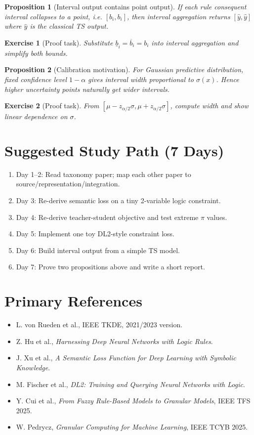 ﻿\documentclass[11pt,a4paper]{article}
\newtheorem{proposition}{Proposition}
\newtheorem{exercise}{Exercise}
\begin{document}
\begin{proposition}[Interval output contains point output]
If each rule consequent interval collapses to a point, i.e. $[b_i,b_i]$, then interval aggregation returns
\([\hat y,\hat y]\)
where $\hat y$ is the classical TS output.
\end{proposition}

\begin{exercise}[Proof task]
Substitute $\underline b_i=\overline b_i=b_i$ into interval aggregation and simplify both bounds.
\end{exercise}

\begin{proposition}[Calibration motivation]
For Gaussian predictive distribution, fixed confidence level $1-\alpha$ gives interval width proportional to $\sigma(x)$.
Hence higher uncertainty points naturally get wider intervals.
\end{proposition}

\begin{exercise}[Proof task]
From $[\mu-z_{\alpha/2}\sigma,\mu+z_{\alpha/2}\sigma]$, compute width and show linear dependence on $\sigma$.
\end{exercise}

\section{Suggested Study Path (7 Days)}
\begin{enumerate}
\item Day 1--2: Read taxonomy paper; map each other paper to source/representation/integration.
\item Day 3: Re-derive semantic loss on a tiny 2-variable logic constraint.
\item Day 4: Re-derive teacher-student objective and test extreme $\pi$ values.
\item Day 5: Implement one toy DL2-style constraint loss.
\item Day 6: Build interval output from a simple TS model.
\item Day 7: Prove two propositions above and write a short report.
\end{enumerate}

\section{Primary References}
\begin{itemize}
\item L. von Rueden et al., IEEE TKDE, 2021/2023 version.
\item Z. Hu et al., \emph{Harnessing Deep Neural Networks with Logic Rules}.
\item J. Xu et al., \emph{A Semantic Loss Function for Deep Learning with Symbolic Knowledge}.
\item M. Fischer et al., \emph{DL2: Training and Querying Neural Networks with Logic}.
\item Y. Cui et al., \emph{From Fuzzy Rule-Based Models to Granular Models}, IEEE TFS 2025.
\item W. Pedrycz, \emph{Granular Computing for Machine Learning}, IEEE TCYB 2025.
\end{itemize}
\end{document}
